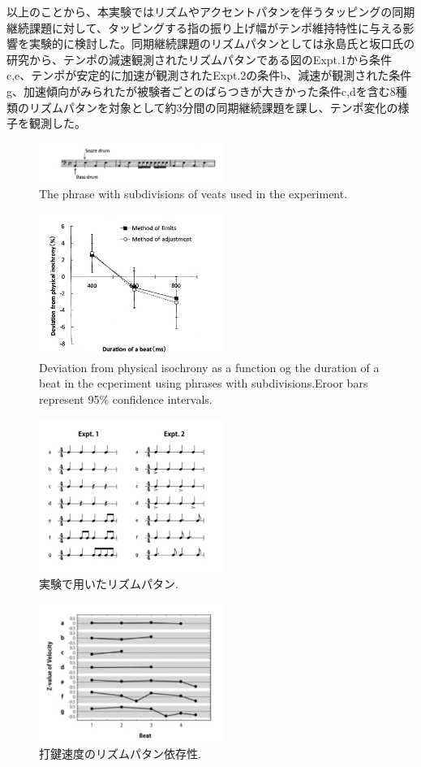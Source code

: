 \documentclass[twocolumn,10pt]{jarticle}
\begin{document}
以上のことから、本実験ではリズムやアクセントパタンを伴うタッピングの同期継続課題に対して、タッピングする指の振り上げ幅がテンポ維持特性に与える影響を実験的に検討した。同期継続課題のリズムパタンとしては永島氏と坂口氏\cite{Nagasima}の研究から、テンポの減速観測されたリズムパタンである図\label{Nagasima}のExpt.1から条件c,e、テンポが安定的に加速が観測されたExpt.2の条件b、減速が観測された条件g、加速傾向がみられたが被験者ごとのばらつきが大きかった条件c,dを含む8種類のリズムパタンを対象として約3分間の同期継続課題を課し、テンポ変化の様子を観測した。
\begin{figure}
  \centering
  \includegraphics[width=6cm]{Arao_f1.jpg}
  \caption{The phrase with subdivisions of veats used in the experiment.\cite{Arao}}
  \label{Arao_f1}
\end{figure}
\begin{figure}
  \centering
  \includegraphics[width=6cm]{Arao_f2.jpg}
  \caption{Deviation from physical isochrony as a function og the duration of a beat in the ecperiment using phrases with subdivisions.Eroor bars represent 95\% confidence intervals.\cite{Arao}}
  \label{Arao_f2}
\end{figure}
\begin{figure}
  \centering
  \includegraphics[width=6cm]{Nagasima.jpg}
  \caption{実験で用いたリズムパタン.\cite{Nagasima}}
  \label{Nagasima}
\end{figure}
\begin{figure}
  \centering
  \includegraphics[width=6cm]{Nagasima_2.jpg}
  \caption{打鍵速度のリズムパタン依存性.\cite{Nagasima}}
  \label{Nagasima}
\end{figure}
\end{document}
